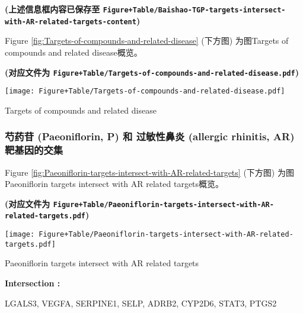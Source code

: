 \documentclass[
]{article}
\begin{document}
\textbf{(上述信息框内容已保存至 \texttt{Figure+Table/Baishao-TGP-targets-intersect-with-AR-related-targets-content})}

Figure \ref{fig:Targets-of-compounds-and-related-disease} (下方图) 为图Targets of compounds and related disease概览。

\textbf{(对应文件为 \texttt{Figure+Table/Targets-of-compounds-and-related-disease.pdf})}

\def\@captype{figure}
\begin{center}
\texttt{[image: Figure+Table/Targets-of-compounds-and-related-disease.pdf]}
\caption{Targets of compounds and related disease}\label{fig:Targets-of-compounds-and-related-disease}
\end{center}

\hypertarget{ux828dux836fux82f7-paeoniflorin-p-ux548c-ux8fc7ux654fux6027ux9f3bux708e-allergic-rhinitis-ar-ux9776ux57faux56e0ux7684ux4ea4ux96c6}{%
\subsubsection{芍药苷 (Paeoniflorin, P) 和 过敏性鼻炎 (allergic rhinitis, AR) 靶基因的交集}\label{ux828dux836fux82f7-paeoniflorin-p-ux548c-ux8fc7ux654fux6027ux9f3bux708e-allergic-rhinitis-ar-ux9776ux57faux56e0ux7684ux4ea4ux96c6}}

Figure \ref{fig:Paeoniflorin-targets-intersect-with-AR-related-targets} (下方图) 为图Paeoniflorin targets intersect with AR related targets概览。

\textbf{(对应文件为 \texttt{Figure+Table/Paeoniflorin-targets-intersect-with-AR-related-targets.pdf})}

\def\@captype{figure}
\begin{center}
\texttt{[image: Figure+Table/Paeoniflorin-targets-intersect-with-AR-related-targets.pdf]}
\caption{Paeoniflorin targets intersect with AR related targets}\label{fig:Paeoniflorin-targets-intersect-with-AR-related-targets}
\end{center}
\begin{center}\begin{tcolorbox}[colback=gray!10, colframe=gray!50, width=0.9\linewidth, arc=1mm, boxrule=0.5pt]
\textbf{
Intersection
:}

\vspace{0.5em}

    LGALS3, VEGFA, SERPINE1, SELP, ADRB2, CYP2D6, STAT3,
PTGS2

\vspace{2em}
\end{tcolorbox}
\end{center}
\end{document}
